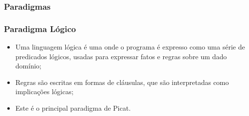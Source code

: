 \subsubsection{Paradigmas}
\begin{frame}[fragile]
	\frametitle{Paradigma Lógico}
    
    \begin{itemize}
    
    	\item Uma linguagem lógica é uma onde o programa é expresso como uma série
        de predicados lógicos, usadas para expressar fatos e regras sobre um dado domínio;
    
    	\item Regras são escritas em formas de cláusulas, que são interpretadas como
        implicações lógicas;
        
        \item Este é o principal paradigma de Picat.
    \end{itemize}

\end{frame}


